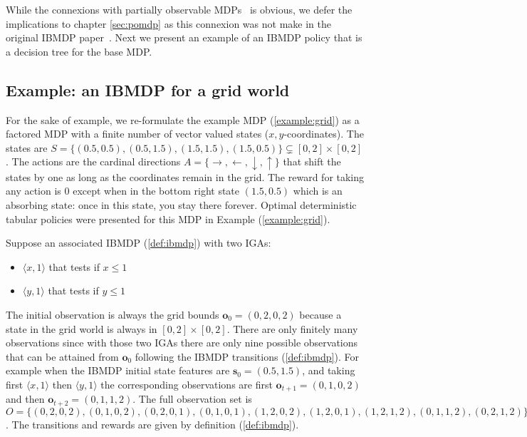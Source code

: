 While the connexions with partially observable MDPs~\cite{POMDP,chap2} is obvious, we defer the implications to chapter \ref{sec:pomdp} as this connexion was not make in the original IBMDP paper~\cite{topin2021iterative}.
Next we present an example of an IBMDP policy that is a decision tree for the base MDP.

\subsection{Example: an IBMDP for a grid world}
For the sake of example, we re-formulate the example MDP (\ref{example:grid}) as a factored MDP with a finite number of vector valued states ($x,y$-coordinates).
The states are $S = \{(0.5, 0.5), (0.5, 1.5), (1.5, 1.5), (1.5, 0.5)\}\subsetneq [0, 2] \times [0, 2]$.
The actions are the cardinal directions $A = \{\rightarrow, \leftarrow, \downarrow, \uparrow\}$ that shift the states by one as long as the coordinates remain in the grid.
The reward for taking any action is 0 except when in the bottom right state $(1.5, 0.5)$ which is an absorbing state: once in this state, you stay there forever. 
Optimal deterministic tabular policies were presented for this MDP in Example (\ref{example:grid}).

Suppose an associated IBMDP (\ref{def:ibmdp}) with two IGAs:
\begin{itemize}
    \item $\langle x, 1\rangle$ that tests if $x\leq 1$
    \item $\langle y, 1\rangle$ that tests if $y\leq 1$
\end{itemize}
The initial observation is always the grid bounds $\boldsymbol{o}_0=(0, 2, 0, 2)$ because a state in the grid world is always in $[0, 2] \times [0, 2]$.
There are only finitely many observations since with those two IGAs there are only nine possible observations that can be attained from $\boldsymbol{o}_0$ following the IBMDP transitions (\ref{def:ibmdp}).
For example when the IBMDP initial state features are $\boldsymbol{s}_0 = (0.5, 1.5)$, and taking first $\langle x, 1\rangle$ then $\langle y, 1\rangle$ the corresponding observations are first $\boldsymbol{o}_{t+1} = (0, 1, 0, 2)$ and then $\boldsymbol{o}_{t+2} = (0, 1, 1, 2)$.
The full observation set is $O = \{(0, 2, 0, 2), (0, 1, 0, 2), (0, 2, 0, 1), (0, 1, 0, 1), (1, 2, 0, 2), (1, 2, 0, 1), (1, 2, 1, 2), (0, 1, 1, 2), (0, 2, 1, 2)\}$.
The transitions and rewards are given by definition (\ref{def:ibmdp}).

